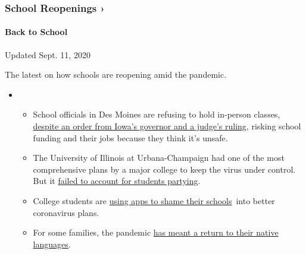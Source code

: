 \href{https://www.nytimes3xbfgragh.onion/spotlight/schools-reopening?action=click\&pgtype=Article\&state=default\&region=MAIN_CONTENT_3\&context=storylines_keepup}{}

\hypertarget{school-reopenings-}{%
\subsubsection{School Reopenings ›}\label{school-reopenings-}}

\hypertarget{back-to-school}{%
\paragraph{Back to School}\label{back-to-school}}

Updated Sept. 11, 2020

The latest on how schools are reopening amid the pandemic.

\begin{itemize}
\item
  \begin{itemize}
  \tightlist
  \item
    School officials in Des Moines are refusing to hold in-person
    classes,
    \href{https://www.nytimes3xbfgragh.onion/2020/09/10/us/des-moines-school-opening-coronavirus.html?action=click\&pgtype=Article\&state=default\&region=MAIN_CONTENT_3\&context=storylines_keepup}{despite
    an order from Iowa's governor and a judge's ruling}, risking school
    funding and their jobs because they think it's unsafe.
  \item
    The University of Illinois at Urbana-Champaign had one of the most
    comprehensive plans by a major college to keep the virus under
    control. But it
    \href{https://www.nytimes3xbfgragh.onion/2020/09/10/health/university-illinois-covid.html?action=click\&pgtype=Article\&state=default\&region=MAIN_CONTENT_3\&context=storylines_keepup}{failed
    to account for students partying}.
  \item
    College students are
    \href{https://www.nytimes3xbfgragh.onion/2020/09/10/technology/coronavirus-quarantines-college.html?action=click\&pgtype=Article\&state=default\&region=MAIN_CONTENT_3\&context=storylines_keepup}{using
    apps to shame their schools}~into better coronavirus plans.
  \item
    For some families, the pandemic
    \href{https://www.nytimes3xbfgragh.onion/2020/09/10/parenting/family-second-language-coronavirus.html?action=click\&pgtype=Article\&state=default\&region=MAIN_CONTENT_3\&context=storylines_keepup}{has
    meant a return to their native languages}.
  \end{itemize}
\end{itemize}

